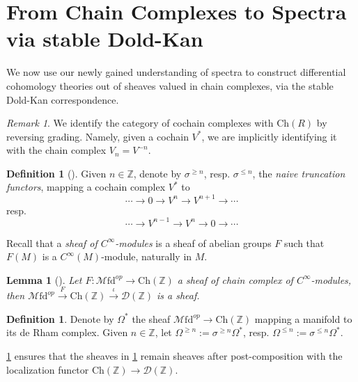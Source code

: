 \documentclass[10pt]{amsart}
\newcommand{\D}{\mathscr{D}}
\newcommand{\bZ}{\mathbb{Z}}
\newcommand{\Ch}{\mathrm{Ch}}
\newcommand{\Mfd}{\mathscr{M}\mathrm{fd}}
\newcommand{\Ab}{\mathscr{A}\mathrm{b}}
\newtheorem{lemma}[equation]{Lemma}
\theoremstyle{definition}
\newtheorem{definition}[equation]{Definition}
\theoremstyle{remark}
\newtheorem{remark}[equation]{Remark}
\begin{document}
\section{From Chain Complexes to Spectra via stable Dold-Kan}
We now use our newly gained understanding of spectra to construct differential cohomology theories out of sheaves valued in chain complexes, via the stable Dold-Kan correspondence.
\begin{remark}\label{id}
  We identify the category of cochain complexes with $\Ch(R)$ by reversing grading. Namely, given a cochain $V^*$, we are implicitly identifying it with the chain complex $V_n=V^{-n}$. 
\end{remark}
\begin{definition}[{\cite[Definition 7.14]{bunkenikolausvoelkl2016diffcoh}}]Given $n\in\bZ$, denote by $\sigma^{\geq n}$, resp. $\sigma^{\leq n}$, the \emph{naive truncation functors}, mapping a cochain complex $V^*$ to \[\cdots\to0\to V^n\to V^{n+1}\to\cdots\]
  resp. \[\cdots\to V^{n-1}\to V^n\to0\to\cdots\]
\end{definition}
Recall that a \emph{sheaf of $C^\infty$-modules} is a sheaf of abelian groups $F$ such that $F(M)$ is a $C^\infty(M)$-module, naturally in $M$. 
\begin{lemma}[{\cite[Lemma 7.12]{bunkenikolausvoelkl2016diffcoh}}]\label{localization}
  Let $F:\Mfd^{op}\to\Ch(\bZ)$ a sheaf of chain complex of $C^\infty$-modules, then $\Mfd^{op}\xrightarrow{F}\Ch(\bZ)\xrightarrow{\iota}\D(\bZ)$ is a sheaf. 
\end{lemma}
\begin{definition}\label{def:forms}
  Denote by $\Omega^*$ the sheaf $\Mfd^{op}\to\Ch(\bZ)$ mapping a manifold to its de Rham complex. Given $n\in\bZ$, let $\Omega^{\geq n}:=\sigma^{\geq n}\Omega^*$, resp. $\Omega^{\leq n}:=\sigma^{\leq n}\Omega^*$.
\end{definition}
\cref{localization} ensures that the sheaves in \cref{def:forms} remain sheaves after post-composition with the localization functor $\Ch(\bZ)\to\D(\bZ)$. 




\end{document}
